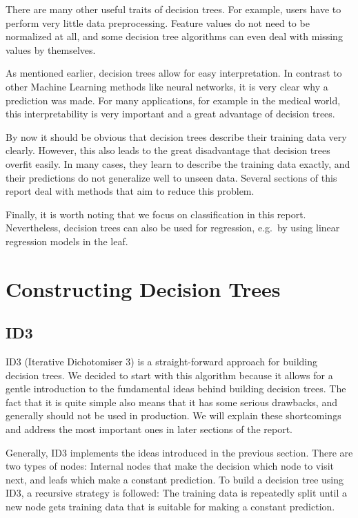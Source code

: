 \documentclass[a4paper]{article}
\begin{document}
There are many other useful traits of decision trees. For example, users have to perform very little data preprocessing. Feature values do not need to be normalized at all, and some decision tree algorithms can even deal with missing values by themselves.

As mentioned earlier, decision trees allow for easy interpretation. In contrast to other Machine Learning methods like neural networks, it is very clear why a prediction was made. For many applications, for example in the medical world, this interpretability is very important and a great advantage of decision trees.

By now it should be obvious that decision trees describe their training data very clearly. However, this also leads to the great disadvantage that decision trees overfit easily. In many cases, they learn to describe the training data exactly, and their predictions do not generalize well to unseen data. Several sections of this report deal with methods that aim to reduce this problem.

Finally, it is worth noting that we focus on classification in this report. Nevertheless, decision trees can also be used for regression, e.g.\ by using linear regression models in the leaf.

\section{Constructing Decision Trees}

\subsection{ID3}

ID3 (Iterative Dichotomiser 3) is a straight-forward approach for building decision trees. We decided to start with this algorithm because it allows for a gentle introduction to the fundamental ideas behind building decision trees.
The fact that it is quite simple also means that it has some serious drawbacks, and generally should not be used in production. We will explain these shortcomings and address the most important ones in later sections of the report.

Generally, ID3 implements the ideas introduced in the previous section. There are two types of nodes: Internal nodes that make the decision which node to visit next, and leafs  which make a constant prediction.
To build a decision tree using ID3, a recursive strategy is followed: The training data is repeatedly split until a new node gets training data that is suitable for making a constant prediction.
\end{document}
